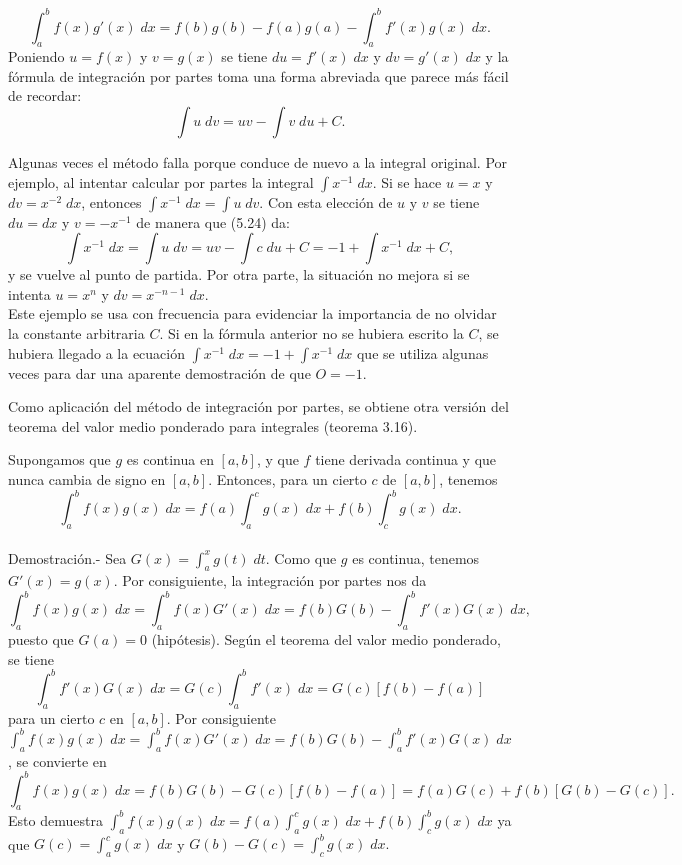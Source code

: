 $$\int_a^b  f(x)g'(x)\; dx = f(b)g(b)-f(a)g(a)-\int_a^b f'(x)g(x)\; dx.$$
Poniendo $u=f(x)$ y $v=g(x)$ se tiene $du=f'(x)\; dx$ y $dv=g'(x)\; dx$ y la fórmula de integración por partes toma una forma abreviada que parece más fácil de recordar:
$$\int u\; dv = uv-\int v\; du +C.$$

\begin{ejem}
    Algunas veces el método falla porque conduce de nuevo a la integral original. Por ejemplo, al intentar calcular por partes la integral $\int x^{-1}\; dx$. Si se hace $u = x$ y $dv = x^{-2}\;dx$, entonces $\int x^{-1}\; dx = \int u\; dv$. Con esta elección de $u$ y $v$ se tiene $du = dx$ y $v = - x^{-1}$ de manera que (5.24) da:
    $$\int x^{-1}\;dx = \int u \; dv = uv-\int c \; du + C = -1 +\int x^{-1}\; dx + C,$$
    y se vuelve al punto de partida. Por otra parte, la situación no mejora si se intenta $u = x^n$ y $dv = x^{-n-1}\; dx.$\\
    Este ejemplo se usa con frecuencia para evidenciar la importancia de no olvidar la constante arbitraria $C$. Si en la fórmula anterior no se hubiera escrito la $C$, se hubiera llegado a la ecuación $\int x^{-1}\; dx = - 1 + \int x^{-1}\; dx$ que se utiliza algunas veces para dar una aparente demostración de que $O = - 1$.
\end{ejem}

Como aplicación del método de integración por partes, se obtiene otra versión del teorema del valor medio ponderado para integrales (teorema 3.16).

\begin{teo}
    Supongamos que $g$ es continua en $[a,b]$, y que $f$ tiene derivada continua y que nunca cambia de signo en $[a,b]$. Entonces, para un cierto $c$ de $[a,b]$, tenemos
    $$\int_a^b f(x)g(x)\; dx = f(a)\int_a^c g(x)\; dx + f(b)\int_c^b g(x)\; dx.$$\\
	Demostración.-\; Sea $G(x)=\int_a^x g(t)\; dt$. Como que $g$ es continua, tenemos $G'(x)=g(x)$. Por consiguiente, la integración por partes nos da
	$$\int_a^b f(x)g(x)\; dx = \int_a^b f(x)G'(x)\; dx = f(b)G(b)-\int_a^b f'(x)G(x)\; dx,$$
	puesto que $G(a)=0$ (hipótesis). Según el teorema del valor medio ponderado, se tiene
	$$\int_a^b f'(x)G(x)\; dx = G(c)\int_a^b f'(x)\; dx = G(c)[f(b)-f(a)]$$
	para un cierto $c$ en $[a,b]$. Por consiguiente $\int_a^b f(x)g(x)\; dx = \int_a^b f(x)G'(x)\; dx = f(b)G(b)-\int_a^b f'(x)G(x)\; dx$, se convierte en 
	$$\int_a^b f(x)g(x)\; dx = f(b)G(b)-G(c)[f(b)-f(a)]=f(a)G(c)+f(b)[G(b)-G(c)].$$
	Esto demuestra $\int_a^b f(x)g(x)\; dx = f(a)\int_a^c g(x)\; dx + f(b)\int_c^b g(x)\; dx$ ya que $G(c)=\int_a^c g(x)\; dx$ y $G(b)-G(c)=\int_c^b g(x)\; dx.$
\end{teo}


